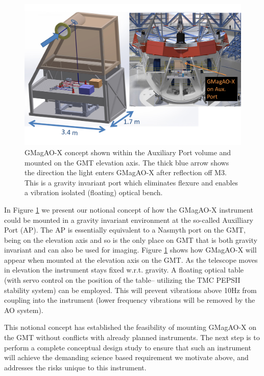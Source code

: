 \documentclass[12pt,preprint]{aastex}
\begin{document}
\begin{figure}[h!]
\centering
\includegraphics[width=6in]{figures/GMagAOX__fig4_no_labels_V2.png}
\vspace{-0.2in}
\caption{ GMagAO-X concept shown within the Auxiliary Port volume and mounted on the GMT elevation axis. The thick blue arrow shows the direction the light enters GMagAO-X after reflection off M3. This is a gravity invariant port which eliminates flexure and enables a vibration isolated (floating) optical bench. \label{fig:ap}}
\vspace{-0.1in}
\end{figure}

In Figure \ref{fig:ap} we present our notional concept of how the GMagAO-X instrument could be mounted in a gravity invariant environment at the so-called Auxilliary Port (AP). The AP is essentially equivalent to a Nasmyth port on the GMT, being on the elevation axis and so is the only place on GMT that is both gravity invariant and can also be used for imaging.  Figure \ref{fig:ap} shows how GMagAO-X will appear when mounted at the elevation axis on the GMT. As the telescope moves in elevation the instrument stays fixed w.r.t. gravity. A floating optical table (with servo control on the position of the table-- utilizing the TMC PEPSII stability system) can be employed.  This will prevent vibrations above 10Hz from coupling into the instrument (lower frequency vibrations will be removed by the AO system). 

This notional concept has established the feasibility of mounting GMagAO-X on the GMT without conflicts with already planned instruments.  The next step is to perform a complete conceptual design study to ensure that such an instrument will achieve the demanding science based requirement we motivate above, and addresses the risks unique to this instrument. 
\end{document}
